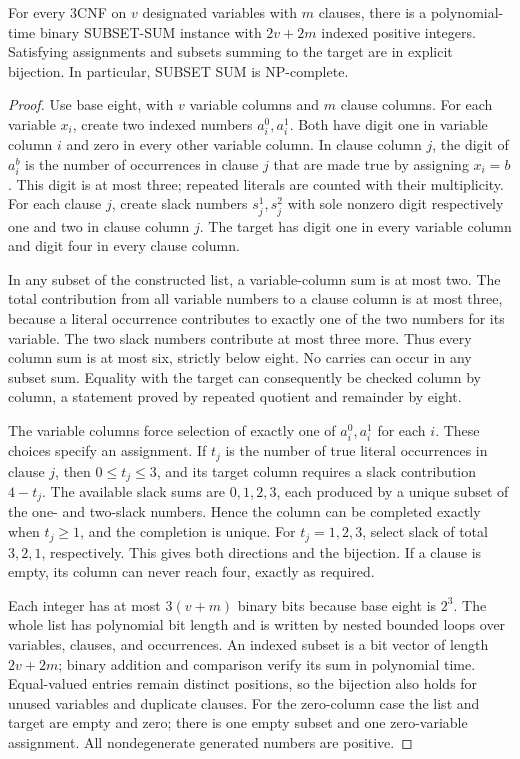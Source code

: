 \begin{theorem}\label{thm:N09}
For every 3CNF on $v$ designated variables with $m$ clauses, there is a
polynomial-time binary SUBSET-SUM instance with $2v+2m$ indexed positive
integers. Satisfying assignments and subsets summing to the target are in
explicit bijection. In particular, SUBSET SUM is NP-complete.
\end{theorem}
\begin{proof}
Use base eight, with $v$ variable columns and $m$ clause columns. For each
variable $x_i$, create two indexed numbers $a_i^0,a_i^1$. Both have digit one
in variable column $i$ and zero in every other variable column. In clause
column $j$, the digit of $a_i^b$ is the number of occurrences in clause $j$
that are made true by assigning $x_i=b$. This digit is at most three; repeated
literals are counted with their multiplicity. For each clause $j$, create
slack numbers $s_j^1,s_j^2$ with sole nonzero digit respectively one and two
in clause column $j$. The target has digit one in every variable column and
digit four in every clause column.

In any subset of the constructed list, a variable-column sum is at most two.
The total contribution from all variable numbers to a clause column is at
most three, because a literal occurrence contributes to exactly one of the
two numbers for its variable. The two slack numbers contribute at most three
more. Thus every column sum is at most six, strictly below eight. No carries
can occur in any subset sum. Equality with the target can consequently be
checked column by column, a statement proved by repeated quotient and
remainder by eight.

The variable columns force selection of exactly one of $a_i^0,a_i^1$ for
each $i$. These choices specify an assignment. If $t_j$ is the number of true
literal occurrences in clause $j$, then $0\le t_j\le3$, and its target column
requires a slack contribution $4-t_j$. The available slack sums are
$0,1,2,3$, each produced by a unique subset of the one- and two-slack numbers.
Hence the column can be completed exactly when $t_j\ge1$, and the completion
is unique. For $t_j=1,2,3$, select slack of total $3,2,1$, respectively.
This gives both directions and the bijection. If a clause is empty, its
column can never reach four, exactly as required.

Each integer has at most $3(v+m)$ binary bits because base eight is $2^3$.
The whole list has polynomial bit length and is written by nested bounded
loops over variables, clauses, and occurrences. An indexed subset is a bit
vector of length $2v+2m$; binary addition and comparison verify its sum in
polynomial time. Equal-valued entries remain distinct positions, so the
bijection also holds for unused variables and duplicate clauses. For the
zero-column case the list and target are empty and zero; there is one empty
subset and one zero-variable assignment. All nondegenerate generated numbers
are positive.
\end{proof}

